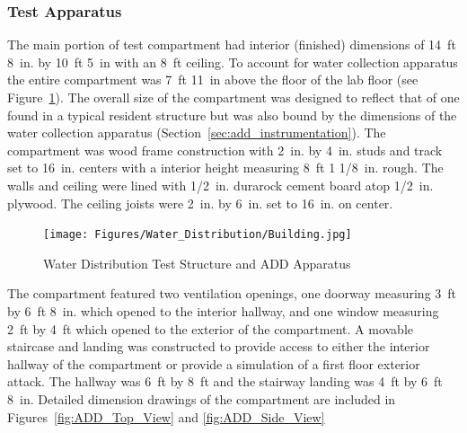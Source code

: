 \documentclass{article}
\begin{document}
\subsubsection{Test Apparatus}
\label{ADD_discussion}
The main portion of test compartment had interior (finished) dimensions of 14~ft 8~in. by 10~ft 5~in with an 8~ft ceiling. To account for water collection apparatus the entire compartment was 7~ft 11~in above the floor of the lab floor (see Figure~\ref{fig:Water_Distribution_Test_Structure_and_ADD_Apparatus}). The overall size of the compartment was designed to reflect that of one found in a typical resident structure but was also bound by the dimensions of the water collection apparatus (Section~\ref{sec:add_instrumentation}). The compartment was wood frame construction with 2~in. by 4~in. studs and track set to 16~in. centers with a interior height measuring 8~ft 1 1/8~in. rough. The walls and ceiling were lined with 1/2~in. durarock cement board atop 1/2~in. plywood. The ceiling joists were 2~in. by 6~in. set to 16~in. on center.

\begin{figure}[!ht]
	\centering
	\texttt{[image: Figures/Water\_Distribution/Building.jpg]}
	\caption{Water Distribution Test Structure and ADD Apparatus}
	\label{fig:Water_Distribution_Test_Structure_and_ADD_Apparatus}
\end{figure}

The compartment featured two ventilation openings, one doorway measuring 3~ft by 6~ft 8~in. which opened to the interior hallway, and one window measuring 2~ft by 4~ft which opened to the exterior of the compartment. A movable staircase and landing was constructed to provide access to either the interior hallway of the compartment or provide a simulation of a first floor exterior attack. The hallway was 6~ft by 8~ft and the stairway landing was 4~ft by 6~ft 8~in. Detailed dimension drawings of the compartment are included in Figures~\ref{fig:ADD_Top_View} and \ref{fig:ADD_Side_View}
\end{document}
